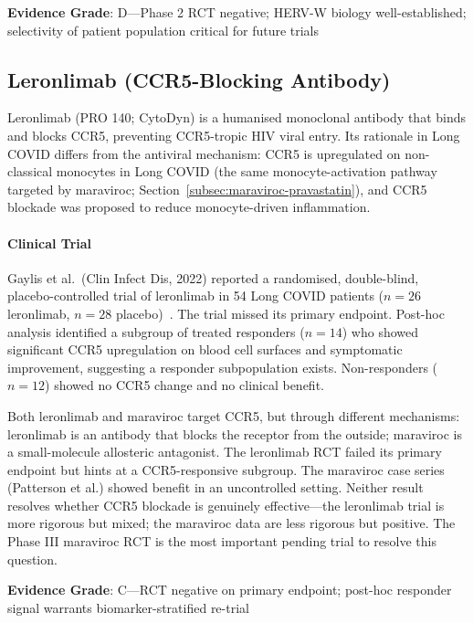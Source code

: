 \textbf{Evidence Grade}: D---Phase 2 RCT negative; HERV-W biology well-established; selectivity of patient population critical for future trials

\subsection{Leronlimab (CCR5-Blocking Antibody)}
\label{subsec:leronlimab}

Leronlimab (PRO 140; CytoDyn) is a humanised monoclonal antibody that binds and blocks CCR5, preventing CCR5-tropic HIV viral entry. Its rationale in Long COVID differs from the antiviral mechanism: CCR5 is upregulated on non-classical monocytes in Long COVID (the same monocyte-activation pathway targeted by maraviroc; Section~\ref{subsec:maraviroc-pravastatin}), and CCR5 blockade was proposed to reduce monocyte-driven inflammation.

\paragraph{Clinical Trial}

Gaylis et al.\ (Clin Infect Dis, 2022) reported a randomised, double-blind, placebo-controlled trial of leronlimab in 54 Long COVID patients ($n=26$ leronlimab, $n=28$ placebo)~\cite{Gaylis2022leronlimab}. The trial missed its primary endpoint. Post-hoc analysis identified a subgroup of treated responders ($n=14$) who showed significant CCR5 upregulation on blood cell surfaces and symptomatic improvement, suggesting a responder subpopulation exists. Non-responders ($n=12$) showed no CCR5 change and no clinical benefit.

\begin{limitation}
Both leronlimab and maraviroc target CCR5, but through different mechanisms: leronlimab is an antibody that blocks the receptor from the outside; maraviroc is a small-molecule allosteric antagonist. The leronlimab RCT failed its primary endpoint but hints at a CCR5-responsive subgroup. The maraviroc case series (Patterson et al.) showed benefit in an uncontrolled setting. Neither result resolves whether CCR5 blockade is genuinely effective---the leronlimab trial is more rigorous but mixed; the maraviroc data are less rigorous but positive. The Phase III maraviroc RCT is the most important pending trial to resolve this question.
\end{limitation}

\textbf{Evidence Grade}: C---RCT negative on primary endpoint; post-hoc responder signal warrants biomarker-stratified re-trial

